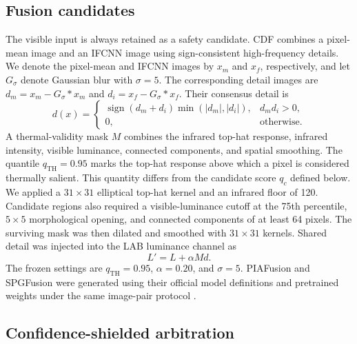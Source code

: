 \documentclass[preprint,11pt]{elsarticle}
\begin{document}
\subsection{Fusion candidates}

The visible input is always retained as a safety candidate. CDF combines a
pixel-mean image and an IFCNN image using sign-consistent high-frequency
details. We denote the pixel-mean and IFCNN images by \(x_m\) and \(x_f\),
respectively, and let \(G_\sigma\) denote Gaussian blur with \(\sigma=5\). The
corresponding detail images are
\(d_m=x_m-G_\sigma*x_m\) and \(d_i=x_f-G_\sigma*x_f\). Their consensus detail
is
\begin{equation}
d(x)=
\begin{cases}
\operatorname{sign}(d_m+d_i)\min(|d_m|,|d_i|), & d_m d_i>0,\\
0, & \text{otherwise}.
\end{cases}
\end{equation}
A thermal-validity mask \(M\) combines the infrared top-hat response, infrared
intensity, visible luminance, connected components, and spatial smoothing. The
quantile \(q_{\mathrm{TH}}=0.95\) marks the top-hat response above which a pixel
is considered thermally salient. This quantity differs from the candidate score
\(q_c\) defined below. We applied a \(31\times31\) elliptical top-hat kernel and
an infrared floor of 120. Candidate regions also required a visible-luminance
cutoff at the 75th percentile, \(5\times5\) morphological opening, and connected
components of at least 64 pixels. The surviving mask was then dilated and
smoothed with \(31\times31\) kernels. Shared detail was injected into the LAB
luminance channel as
\begin{equation}
L' = L + \alpha M d.
\end{equation}
The frozen settings are \(q_{\mathrm{TH}}=0.95\), \(\alpha=0.20\), and
\(\sigma=5\). PIAFusion and SPGFusion were generated using their official model
definitions and pretrained weights under the same image-pair protocol
\cite{zhang2020,tang2022,zhang2026}.

\subsection{Confidence-shielded arbitration}
\end{document}
